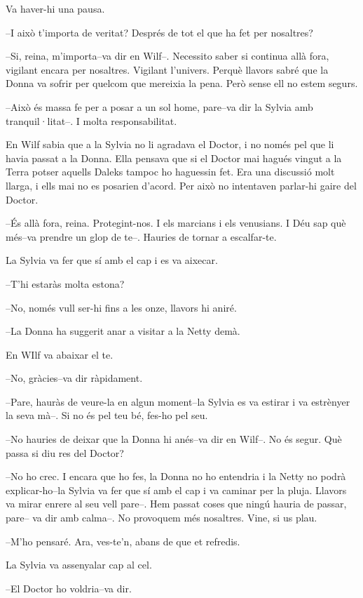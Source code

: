 Va haver-hi una pausa.

--I això t'importa de veritat? Després de tot el que ha fet per
nosaltres?

--Si, reina, m'importa--va dir en Wilf--. Necessito saber si continua
allà fora, vigilant encara per nosaltres. Vigilant l'univers. Perquè
llavors sabré que la Donna va sofrir per quelcom que mereixia la pena.
Però sense ell no estem segurs.

--Això és massa fe per a posar a un sol home, pare--va dir la Sylvia amb
tranquil·litat--. I molta responsabilitat.

En Wilf sabia que a la Sylvia no li agradava el Doctor, i no només pel
que li havia passat a la Donna. Ella pensava que si el Doctor mai hagués
vingut a la Terra potser aquells Daleks tampoc ho haguessin fet. Era una
discussió molt llarga, i ells mai no es posarien d'acord. Per això no
intentaven parlar-hi gaire del Doctor.

--És allà fora, reina. Protegint-nos. I els marcians i els venusians. I
Déu sap què més--va prendre un glop de te--. Hauries de tornar a
escalfar-te.

La Sylvia va fer que sí amb el cap i es va aixecar.

--T'hi estaràs molta estona?

--No, només vull ser-hi fins a les onze, llavors hi aniré.

--La Donna ha suggerit anar a visitar a la Netty demà.

En WIlf va abaixar el te.

--No, gràcies--va dir ràpidament.

--Pare, hauràs de veure-la en algun moment--la Sylvia es va estirar i va
estrènyer la seva mà--. Si no és pel teu bé, fes-ho pel seu.

--No hauries de deixar que la Donna hi anés--va dir en Wilf--. No és
segur. Què passa si diu res del Doctor?

--No ho crec. I encara que ho fes, la Donna no ho entendria i la Netty
no podrà explicar-ho--la Sylvia va fer que sí amb el cap i va caminar
per la pluja. Llavors va mirar enrere al seu vell pare--. Hem passat
coses que ningú hauria de passar, pare-- va dir amb calma--. No
provoquem més nosaltres. Vine, si us plau.

--M'ho pensaré. Ara, ves-te'n, abans de que et refredis.

La Sylvia va assenyalar cap al cel.

--El Doctor ho voldria--va dir.

